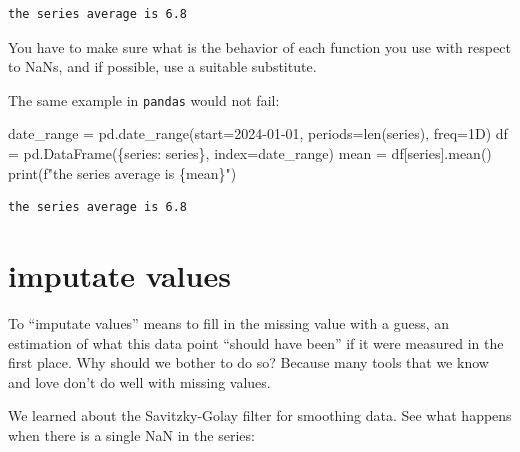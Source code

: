 \documentclass[
  letterpaper,
  DIV=11,
  numbers=noendperiod,
  oneside]{scrreprt}
\newenvironment{Shaded}{\begin{snugshade}}{\end{snugshade}}
\newcommand{\BuiltInTok}[1]{\textcolor[rgb]{0.00,0.23,0.31}{#1}}
\newcommand{\NormalTok}[1]{\textcolor[rgb]{0.00,0.23,0.31}{#1}}
\newcommand{\OperatorTok}[1]{\textcolor[rgb]{0.37,0.37,0.37}{#1}}
\newcommand{\SpecialCharTok}[1]{\textcolor[rgb]{0.37,0.37,0.37}{#1}}
\newcommand{\SpecialStringTok}[1]{\textcolor[rgb]{0.13,0.47,0.30}{#1}}
\newcommand{\StringTok}[1]{\textcolor[rgb]{0.13,0.47,0.30}{#1}}
\begin{document}
\begin{verbatim}
the series average is 6.8
\end{verbatim}

You have to make sure what is the behavior of each function you use with
respect to NaNs, and if possible, use a suitable substitute.

The same example in \texttt{pandas} would not fail:

\begin{Shaded}
\begin{Highlighting}[]
\NormalTok{date\_range }\OperatorTok{=}\NormalTok{ pd.date\_range(start}\OperatorTok{=}\StringTok{\textquotesingle{}2024{-}01{-}01\textquotesingle{}}\NormalTok{, periods}\OperatorTok{=}\BuiltInTok{len}\NormalTok{(series), freq}\OperatorTok{=}\StringTok{\textquotesingle{}1D\textquotesingle{}}\NormalTok{)}
\NormalTok{df }\OperatorTok{=}\NormalTok{ pd.DataFrame(\{}\StringTok{\textquotesingle{}series\textquotesingle{}}\NormalTok{: series\}, index}\OperatorTok{=}\NormalTok{date\_range)}
\NormalTok{mean }\OperatorTok{=}\NormalTok{ df[}\StringTok{\textquotesingle{}series\textquotesingle{}}\NormalTok{].mean()}
\BuiltInTok{print}\NormalTok{(}\SpecialStringTok{f"the series average is }\SpecialCharTok{\{}\NormalTok{mean}\SpecialCharTok{\}}\SpecialStringTok{"}\NormalTok{)}
\end{Highlighting}
\end{Shaded}

\begin{verbatim}
the series average is 6.8
\end{verbatim}

\hypertarget{imputate-values}{%
\section{imputate values}\label{imputate-values}}

To ``imputate values'' means to fill in the missing value with a guess,
an estimation of what this data point ``should have been'' if it were
measured in the first place. Why should we bother to do so? Because many
tools that we know and love don't do well with missing values.

We learned about the Savitzky-Golay filter for smoothing data. See what
happens when there is a single NaN in the series:
\end{document}
